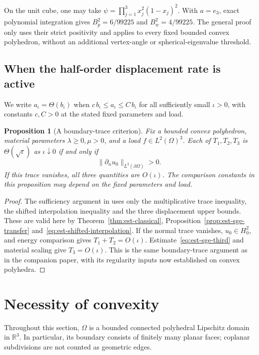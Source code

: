\documentclass[11pt,a4paper]{article}
\newtheorem{proposition}[theorem]{Proposition}
\theoremstyle{remark}
\numberwithin{equation}{section}
\begin{document}
On the unit cube, one may take
$\psi=\prod_{j=1}^3x_j^2(1-x_j)^2$.
With $a=e_3$, exact polynomial integration gives
$B_p^2=6/99225$ and $B_w^2=4/99225$.
The general proof only uses their strict positivity and applies to every
fixed bounded convex polyhedron, without an additional vertex-angle or
spherical-eigenvalue threshold.


\subsection{When the half-order displacement rate is active}

We write $a_\iota=\Theta(b_\iota)$ when $c\,b_\iota\le a_\iota
\le C\,b_\iota$ for all sufficiently small $\iota>0$, with constants
$c,C>0$ at the stated fixed parameters and load.

\begin{proposition}[A boundary-trace criterion]\label{prop:boundary-active}
Fix a bounded convex polyhedron, material parameters \(\lambda\ge0,\mu>0\),
and a load \(f\in L^2(\Omega)^3\). Each of \(T_1,T_2,T_3\) is
\(\Theta(\sqrt{\iota})\) as \(\iota\downarrow0\) if and only if
\[
 \|\partial_nu_0\|_{L^2(\partial\Omega)}>0.
\]
If this trace vanishes, all three quantities are \(O(\iota)\).
The comparison constants in this proposition may depend on the fixed
parameters and load.
\end{proposition}
\begin{proof}
The sufficiency argument in
\cite[Proposition~3.5]{PolygonCompanion2026} uses only the
multiplicative trace inequality, the shifted interpolation inequality
and the three displacement upper bounds. These are valid here by
Theorem~\ref{thm:est-classical}, Proposition~\ref{prop:est-sge-transfer}
and~\eqref{eq:est-shifted-interpolation}.
If the normal trace vanishes, \(u_0\in H^2_0\), and energy comparison
gives \(T_1+T_2=O(\iota)\). Estimate~\eqref{eq:est-sge-third} and
material scaling give \(T_3=O(\iota)\). This is the same
boundary-trace argument as in the companion paper, with its regularity
inputs now established on convex polyhedra.
\end{proof}



\section{Necessity of convexity}\label{sec:necessity}
Throughout this section, $\Omega$ is a bounded connected polyhedral
Lipschitz domain in $\mathbb R^3$.  In particular, its boundary consists of
finitely many planar faces; coplanar subdivisions are not counted as
geometric edges.
\end{document}
